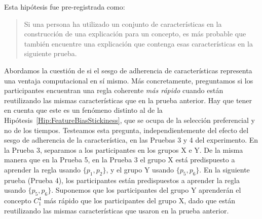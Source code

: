 \begin{hyp}
Esta hipótesis fue pre-registrada como:
\begin{quote}
Si una persona ha utilizado un conjunto de características en la construcción de una explicación para un concepto, es más probable que también encuentre una explicación que contenga esas características en la siguiente prueba.
\end{quote}
\end{hyp}


\begin{hyp}\label{Hip:FeatureBiasTimeAdvantage}
Abordamos la cuestión de si el sesgo de adherencia de características representa una ventaja computacional en sí mismo. Más concretamente, preguntamos si los participantes encuentran una regla coherente {\em más rápido} cuando están reutilizando las mismas características que en la prueba anterior. Hay que tener en cuenta que este es un fenómeno distinto al de la Hipótesis~\ref{Hip:FeatureBiasStickiness}, que se ocupa de la selección preferencial y no de los tiempos.
Testeamos esta pregunta, independientemente del efecto del sesgo de adherencia de la característica, en las Pruebas 3 y 4 del experimento. En la Prueba 3, separamos a los participantes en los grupos X e Y. De la misma manera que en la Prueba 5, en la Prueba 3 el grupo X está predispuesto a aprender la regla usando $\{p_1, p_2 \} $, y el grupo Y usando $\{p_5, p_6 \} $. En la siguiente prueba (Prueba 4), los participantes están predispuestos a aprender la regla usando $\{p_5, p_6 \} $. Suponemos que los participantes del grupo Y aprenderán el concepto $ C^4_1 $ más rápido que los participantes del grupo X, dado que están reutilizando las mismas características que usaron en la prueba anterior.


\end{hyp}
